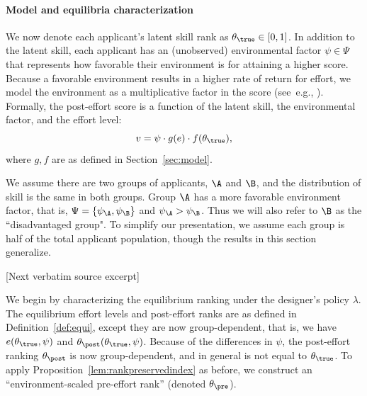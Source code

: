 \documentclass[10pt]{article}
\begin{document}
\begin{ReviewVerbatim}
\paragraph{Model and equilibria characterization} We now denote each applicant's latent skill rank as $\theta_\true \in [0,1]$. In addition to the latent skill, each applicant has an (unobserved) environmental factor $\psi \in \Psi$ that represents how favorable their environment is for attaining a higher score. Because a favorable environment results in a higher rate of return for effort, we model the environment as a multiplicative factor in the score (see~e.g., \citet{calsamiglia09decent}). Formally, the post-effort score is a function of the latent skill, the environmental factor, and the effort level:
\begin{equation*}\label{eq:env-score}
v = \psi \cdot  g(e)\cdot f(\theta_\true),
\end{equation*}
where $g, f$ are as defined in Section~\ref{sec:model}. %


 We assume there are two groups of applicants, $\A$ and $\B$, and the distribution of skill is the same in both groups. Group $\A$ has a more favorable environment factor, that is,  $\Psi = \{\psi_\A, \psi_\B\}$ and $\psi_\A > \psi_\B$. Thus we will also refer to $\B$ as the ``disadvantaged group". To simplify our presentation, we assume each group is half of the total applicant population, though the results in this section generalize.%

[Next verbatim source excerpt]

We begin by characterizing the equilibrium ranking under the designer's policy $\lambda$. The equilibrium effort levels and post-effort ranks are as defined in Definition~\ref{def:equi}, except they are now group-dependent, that is, we have $e(\theta_\true, \psi)$ and $\theta_\post(\theta_\true, \psi)$. Because of the differences in $\psi$, the post-effort ranking $\theta_\post$ is now group-dependent, and in general is not equal to $\theta_\true$. To apply Proposition~\ref{lem:rankpreservedindex} as before, we construct an ``environment-scaled pre-effort rank'' (denoted $\theta_\pre$).
\end{ReviewVerbatim}
\end{document}
